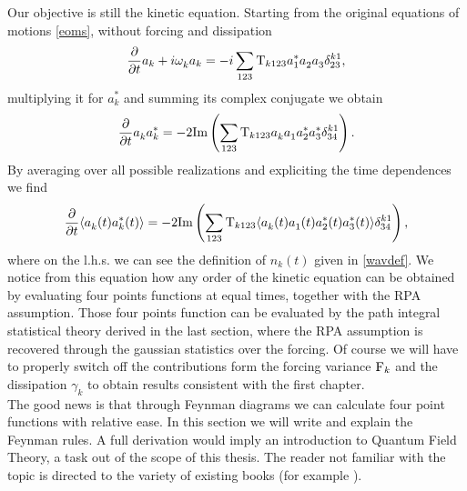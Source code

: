 Our objective is still the kinetic equation. Starting from the original equations of motions \eqref{eoms}, without forcing and dissipation
\begin{equation}
    \frac{\partial}{\partial t} a_k + i \omega^{}_k a_k = -i \sum_{123}\mathrm{T}_{k123} a_1^*a_2^{}a_3^{} \delta^{k1}_{23},
\end{equation}
multiplying it for $a_k^*$ and summing its complex conjugate we obtain
\begin{equation}
    \frac{\partial}{\partial t} a_k^{} a_k^* = -2 \text{Im}\left( \sum_{123}\mathrm{T}_{k123}a_k^{} a_1^{} a_2^* a_3^* \delta^{k1}_{34} \right).
\end{equation} 
By averaging over all possible realizations and expliciting the time dependences we find
\begin{equation}
    \frac{\partial}{\partial t} \langle a_k^{}(t) a_k^*(t) \rangle = -2 \text{Im}\left( \sum_{123}\mathrm{T}_{k123}\langle a_k^{}(t) a_1^{} (t)a_2^*(t) a_3^* (t)\rangle\delta^{k1}_{34} \right),
    \label{kineticprototype}
\end{equation}
where on the l.h.s. we can see the definition of $n_k(t)$ given in \eqref{wavdef}. We notice from this equation how any order of the kinetic equation can be obtained 
by evaluating four points functions at equal times, together with the RPA assumption. Those four points function can be evaluated by the path integral statistical theory 
derived in the last section, where the RPA assumption is recovered through the gaussian statistics over the forcing. Of course we will have to properly 
switch off the contributions form the forcing variance $\mathrm{F}_k$ and the dissipation $\gamma_k$ to obtain results consistent with the first chapter. \\
The good news is that through Feynman diagrams we can calculate four point functions with relative ease. In this section we will write and explain the Feynman rules. 
A full derivation would imply an introduction to Quantum Field Theory, a task out of the scope of this thesis. The reader not familiar with the topic is directed to 
the variety of existing books (for example \cite{Bjorken:1965zz}). \\


